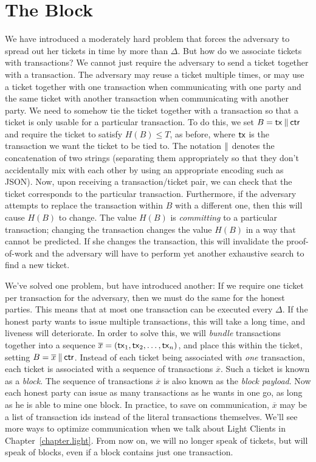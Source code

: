 \section{The Block}

We have introduced a moderately hard problem that forces the adversary to spread out her
tickets in time by more than $\Delta$. But how do we associate tickets with transactions?
We cannot just require the adversary to send a ticket together with a transaction.
The adversary may reuse a ticket multiple times, or may use a ticket together with one transaction
when communicating with one party and the same ticket with another transaction when
communicating with another party. We need to somehow tie the ticket together with a
transaction so that a ticket is only usable for a particular transaction.
To do this, we set $B = \mathsf{tx} \mathbin{\|} \mathsf{ctr}$ and require the ticket to satisfy $H(B) \leq T$,
as before, where $\mathsf{tx}$ is the transaction we want the ticket to be tied to.
The notation $\mathbin{\|}$ denotes the concatenation of two strings (separating them appropriately
so that they don't accidentally mix with each other by using an appropriate encoding such
as JSON).
Now, upon receiving a transaction/ticket pair, we can check that the ticket corresponds
to the particular transaction. Furthermore, if the adversary attempts to replace the
transaction within $B$ with a different one, then this will cause $H(B)$ to change.
The value $H(B)$ is \emph{committing} to a particular transaction; changing the transaction
changes the value $H(B)$ in a way that cannot be predicted. If she changes the transaction,
this will invalidate the proof-of-work and the adversary will have to perform yet another
exhaustive search to find a new ticket.

We've solved one problem, but have introduced another: If we require one ticket per transaction
for the adversary, then we must do the same for the honest parties. This means that at most one
transaction can be executed every $\Delta$. If the honest party wants to issue multiple transactions,
this will take a long time, and liveness will deteriorate. In order to solve this, we will \emph{bundle}
transactions together into a sequence $\overline{x} = (\mathsf{tx}_1, \mathsf{tx}_2, \ldots, \mathsf{tx}_n)$, and place
this within the ticket, setting $B = \overline{x} \mathbin{\|} \mathsf{ctr}$.
Instead of each ticket being associated with \emph{one} transaction, each ticket
is associated with a sequence of transactions $\overline{x}$.
Such a ticket is known as a \emph{block}.
The sequence of transactions $\overline{x}$ is also known as the \emph{block payload}.
Now each honest party can issue as many transactions
as he wants in one go, as long as he is able to mine one block.
In practice, to save on communication, $\overline{x}$ may be a list of transaction ids instead
of the literal transactions themselves. We'll see more ways to optimize communication
when we talk about Light Clients in Chapter~\ref{chapter.light}.
From now on, we will no longer speak of tickets, but will speak of blocks,
even if a block contains just one transaction.

